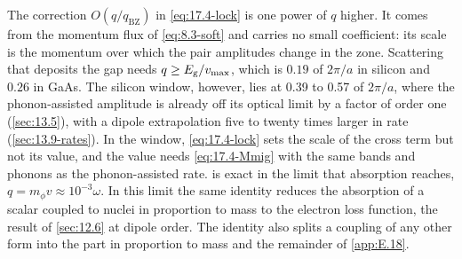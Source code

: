 The correction $O(q/q_{\mathrm{BZ}})$ in \cref{eq:17.4-lock} is one power of $q$ higher. It comes from the momentum flux of \cref{eq:8.3-soft} and carries no small coefficient: its scale is the momentum over which the pair amplitudes change in the zone. Scattering that deposits the gap needs $q \ge E_{\mathrm{g}}/v_{\mathrm{max}}$, which is $0.19$ of $2\pi/a$ in silicon and $0.26$ in GaAs. The silicon window, however, lies at 0.39 to 0.57 of $2\pi/a$, where the phonon-assisted amplitude is already off its optical limit by a factor of order one (\cref{sec:13.5}), with a dipole extrapolation five to twenty times larger in rate (\cref{sec:13.9-rates}). In the window, \cref{eq:17.4-lock} sets the scale of the cross term but not its value, and the value needs \cref{eq:17.4-Mmig} with the same bands and phonons as the phonon-assisted rate.  is exact in the limit that absorption reaches, $q = m_\phi v \approx 10^{-3}\omega$. In this limit the same identity reduces the absorption of a scalar coupled to nuclei in proportion to mass to the electron loss function, the result of \cref{sec:12.6} at dipole order. The identity also splits a coupling of any other form into the part in proportion to mass and the remainder of \cref{app:E.18}.

